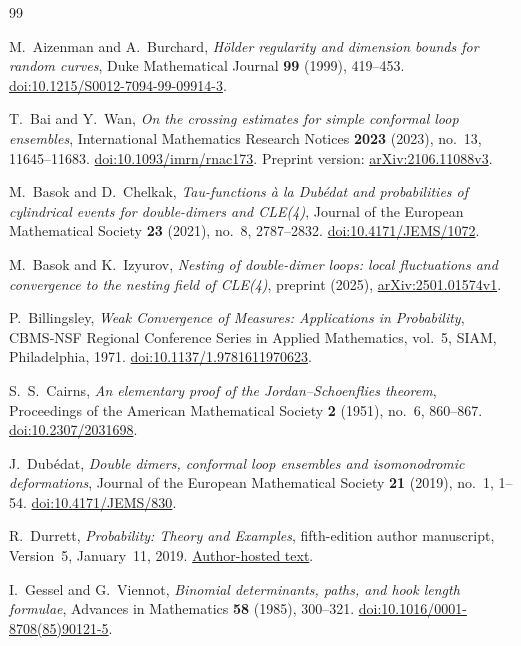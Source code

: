 \begin{thebibliography}{99}

M.~Aizenman and A.~Burchard,
\emph{H\"older regularity and dimension bounds for random curves},
Duke Mathematical Journal \textbf{99} (1999), 419--453.
\href{https://doi.org/10.1215/S0012-7094-99-09914-3}{doi:10.1215/S0012-7094-99-09914-3}.

T.~Bai and Y.~Wan,
\emph{On the crossing estimates for simple conformal loop ensembles},
International Mathematics Research Notices \textbf{2023} (2023), no.~13,
11645--11683.
\href{https://doi.org/10.1093/imrn/rnac173}{doi:10.1093/imrn/rnac173}.
Preprint version:
\href{https://arxiv.org/abs/2106.11088v3}{arXiv:2106.11088v3}.

M.~Basok and D.~Chelkak,
\emph{Tau-functions \`a la Dub\'edat and probabilities of cylindrical events
for double-dimers and CLE(4)},
Journal of the European Mathematical Society \textbf{23} (2021), no.~8,
2787--2832.
\href{https://doi.org/10.4171/JEMS/1072}{doi:10.4171/JEMS/1072}.

M.~Basok and K.~Izyurov,
\emph{Nesting of double-dimer loops: local fluctuations and convergence to
the nesting field of CLE(4)},
preprint (2025),
\href{https://arxiv.org/abs/2501.01574v1}{arXiv:2501.01574v1}.

P.~Billingsley,
\emph{Weak Convergence of Measures: Applications in Probability},
CBMS-NSF Regional Conference Series in Applied Mathematics, vol.~5,
SIAM, Philadelphia, 1971.
\href{https://doi.org/10.1137/1.9781611970623}{doi:10.1137/1.9781611970623}.

S.~S.~Cairns,
\emph{An elementary proof of the Jordan--Schoenflies theorem},
Proceedings of the American Mathematical Society \textbf{2} (1951),
no.~6, 860--867.
\href{https://doi.org/10.2307/2031698}{doi:10.2307/2031698}.

J.~Dub\'edat,
\emph{Double dimers, conformal loop ensembles and isomonodromic deformations},
Journal of the European Mathematical Society \textbf{21} (2019), no.~1,
1--54.
\href{https://doi.org/10.4171/JEMS/830}{doi:10.4171/JEMS/830}.

R.~Durrett,
\emph{Probability: Theory and Examples}, fifth-edition author manuscript,
Version~5, January~11, 2019.
\href{https://sites.math.duke.edu/~rtd/PTE/PTE5_011119.pdf}{Author-hosted text}.

I.~Gessel and G.~Viennot,
\emph{Binomial determinants, paths, and hook length formulae},
Advances in Mathematics \textbf{58} (1985), 300--321.
\href{https://doi.org/10.1016/0001-8708(85)90121-5}{doi:10.1016/0001-8708(85)90121-5}.


\end{thebibliography}
